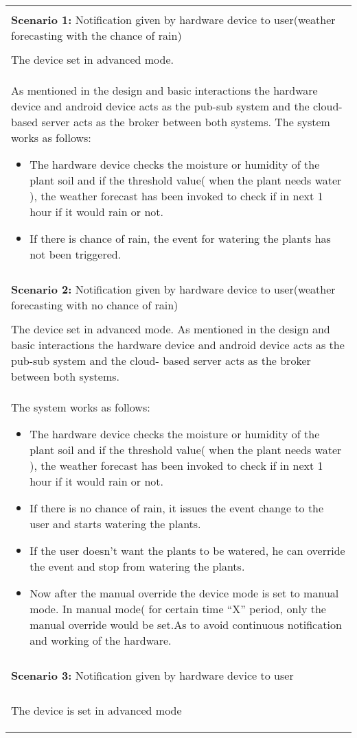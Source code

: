 \documentclass[10pt]{article}
\begin{document}
\begin{longtable}{p{}}%
\hline \\
\textbf{Scenario 1:} Notification given by hardware device to user(weather forecasting with the chance of rain)  \\
\hline    \\

The device set in advanced mode.\\
As mentioned in the design and basic interactions the hardware device and android device acts as the pub-sub system and the cloud- based server acts as the broker between both systems. The system works as follows:
\begin{itemize}
\item
The hardware device checks the moisture or humidity of the plant soil and if the threshold value( when the plant needs water ), the weather forecast has been invoked to check if in next 1 hour if it would rain or not.
\item
If there is chance of rain, the event for watering the plants has not been triggered.
\end{itemize}\\

\pagebreak
\hline \\
\textbf{Scenario 2:} Notification given by hardware device to user(weather forecasting with no chance of rain)\\
\hline
\\
The device set in advanced mode.
As mentioned in the design and basic interactions the hardware device and android device acts as the pub-sub system and the cloud- based server acts as the broker between both systems.\\ The system works as follows:
\begin{itemize}
\item The hardware device checks the moisture or humidity of the plant soil and if the threshold value( when the plant needs water ), the weather forecast has been invoked to check if in next 1 hour if it would rain or not.
\item If there is no chance of rain, it issues the event change to the user and starts watering the plants.
\item If the user doesn’t want the plants to be watered, he can override the event and stop from watering the plants.
\item Now after the manual override the device mode is set to manual mode. In manual mode( for certain time “X” period, only the manual override would be set.As to avoid continuous notification and working of the hardware.
\end{itemize}
\\
\hline \\
\textbf{Scenario 3:} Notification given by hardware device to user\\
\hline
\\
The device is set in advanced mode 
\begin{itemize}


\end{itemize}
\end{longtable}
\end{document}
